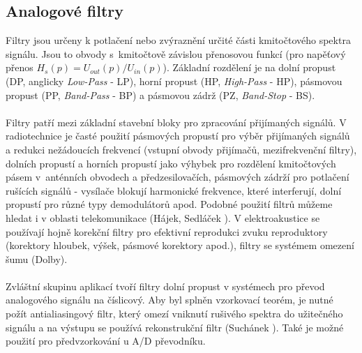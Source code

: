 \subsection{Analogové filtry}
Filtry jsou určeny k potlačení nebo zvýraznění určité části kmitočtového spektra signálu. Jsou to obvody s~kmitočtově závislou přenosovou funkcí (pro napěťový přenos $H_s(p) = U_{out}(p)/U_{in}(p)$). Základní rozdělení je na dolní propust (DP, anglicky \textit{Low-Pass} - LP), horní propust (HP, \textit{High-Pass} - HP), pásmovou propust (PP, \textit{Band-Pass} - BP) a pásmovou zádrž (PZ, \textit{Band-Stop} - BS). \\
\\
Filtry patří mezi základní stavební bloky pro zpracování přijímaných signálů. V radiotechnice je časté použití pásmových propustí pro výběr přijímaných signálů a redukci nežádoucích frekvencí (vstupní obvody přijímačů, mezifrekvenční filtry), dolních propustí a horních propustí jako výhybek pro rozdělení kmitočtových pásem v~anténních obvodech a předzesilovačích, pásmových zádrží pro potlačení rušících signálů - vysílače blokují harmonické frekvence, které interferují, dolní propustí pro různé typy demodulátorů apod. Podobné použití filtrů můžeme hledat i v oblasti telekomunikace (Hájek, Sedláček \cite{5}). V elektroakustice se používají hojně korekční filtry pro efektivní reprodukci zvuku reproduktory (korektory hloubek, výšek, pásmové korektory apod.), filtry se systémem omezení šumu (Dolby).\\
\\
Zvláštní skupinu aplikací tvoří filtry dolní propust v systémech pro převod analogového signálu na číslicový. Aby byl splněn vzorkovací teorém, je nutné požít antialiasingový filtr, který omezí vniknutí rušivého spektra do užitečného signálu a na výstupu se používá rekonstrukční filtr (Suchánek \cite{6}). Také je možné použití pro předvzorkování u A/D převodníku.\\
